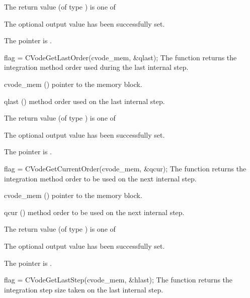 {
  The return value  (of type ) is one of
  \begin{args}
  \item[\Id{CV\_SUCCESS}] 
    The optional output value has been successfully set.
  \item[\Id{CV\_MEM\_NULL}]
    The  pointer is .
  \end{args}
}
{}
{
  flag = CVodeGetLastOrder(cvode\_mem, \&qlast);
}
{
  The function  returns the
  integration method order used during the last internal step.
}
{
  \begin{args}
  \item[cvode\_mem] ()
    pointer to the {\cvode} memory block.
  \item[qlast] ()
    method order used on the last internal step.
  \end{args}
}
{
  The return value  (of type ) is one of
  \begin{args}
  \item[\Id{CV\_SUCCESS}] 
    The optional output value has been successfully set.
  \item[\Id{CV\_MEM\_NULL}]
    The  pointer is .
  \end{args}
}
{}
{
  flag = CVodeGetCurrentOrder(cvode\_mem, \&qcur);
}
{
  The function  returns the
  integration method order to be used on the next internal step.
}
{
  \begin{args}
  \item[cvode\_mem] ()
    pointer to the {\cvode} memory block.
  \item[qcur] ()
    method order to be used on the next internal step.
  \end{args}
}
{
  The return value  (of type ) is one of
  \begin{args}
  \item[\Id{CV\_SUCCESS}] 
    The optional output value has been successfully set.
  \item[\Id{CV\_MEM\_NULL}]
    The  pointer is .
  \end{args}
}
{}
{
  flag = CVodeGetLastStep(cvode\_mem, \&hlast);
}
{
  The function  returns the
  integration step size taken on the last internal step.
}
